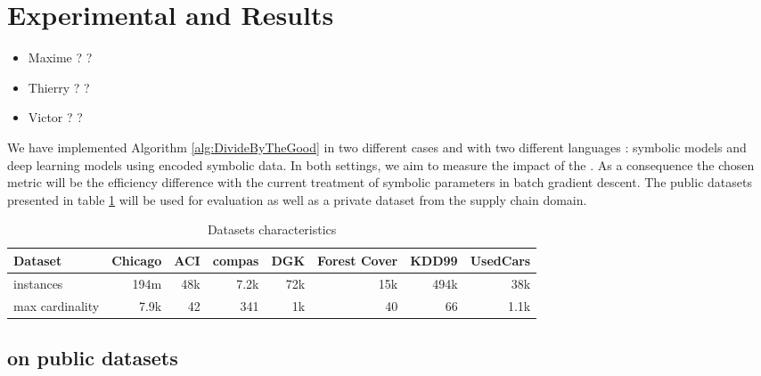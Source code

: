 \section{Experimental and Results}\label{Results}

\begin{itemize}
    \item Maxime \ok ? \no ?
    \item Thierry \ok ? \no ?
    \item Victor \ok ? \no ?
\end{itemize}

We have implemented Algorithm \ref{alg:DivideByTheGood} in two different cases and with two different languages : symbolic models and deep learning models using encoded symbolic data. In both settings, we aim to measure the impact of the \tecname. As a consequence the chosen metric will be the efficiency difference with the current treatment of symbolic parameters in batch gradient descent. The public datasets presented in table \ref{tab:datasetChar} will be used for evaluation as well as a private dataset from the supply chain domain.


\begin{table}[h!] 
  \caption{Datasets characteristics}
  \label{tab:datasetChar}
  \begin{footnotesize}
  \begin{center}
  \begin{tabular}{l|rrrrrrr}
    \textbf{Dataset} & Chicago & ACI & compas & DGK  & Forest Cover & KDD99 & UsedCars \\
    \midrule
    instances        & 194m    & 48k & 7.2k   & 72k  & 15k          & 494k  & 38k      \\
    \midrule 
    max cardinality  & 7.9k    & 42  & 341    & 1k & 40             & 66    & 1.1k     \\ 
    \bottomrule		
\end{tabular}
\end{center}
\end{footnotesize}
\end{table}



\subsection{\catmod on public datasets}\label{subsec:public}
\vline


